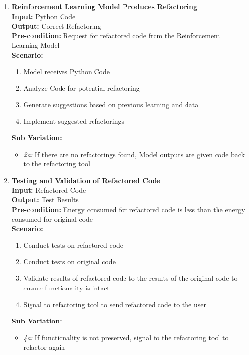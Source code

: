 \documentclass[12pt]{article}
\begin{document}
\begin{enumerate}[label={\bf BUC \arabic*:}, wide=0pt, font=\itshape]
  \item {\bf Reinforcement Learning Model Produces Refactoring} \\[2mm]
    \textbf{Input:} Python Code \\
    \textbf{Output:} Correct Refactoring \\
    \textbf{Pre-condition:} Request for refactored code from the Reinforcement Learning Model \\[2mm]
    \textbf{Scenario: } 
    \begin{enumerate}[label=\arabic*.]
        \item Model receives Python Code
        \item Analyze Code for potential refactoring
        \item Generate suggestions based on previous learning and data
        \item Implement suggested refactorings
    \end{enumerate}
    \textbf{Sub Variation: }
    \begin{itemize}
        \item \textit{2a:} If there are no refactorings found, Model outputs are given code back to the refactoring tool 
    \end{itemize}

  \item {\bf Testing and Validation of Refactored Code} \\[2mm]
    \textbf{Input:} Refactored Code \\
    \textbf{Output:} Test Results \\
    \textbf{Pre-condition:} Energy consumed for refactored code is less than the energy consumed for original code \\[2mm]
    \textbf{Scenario: }
    \begin{enumerate}[label=\arabic*.]
        \item Conduct tests on refactored code
        \item Conduct tests on original code
        \item Validate results of refactored code to the results of the original code to ensure functionality is intact
        \item Signal to refactoring tool to send refactored code to the user
    \end{enumerate}
    \textbf{Sub Variation: }
    \begin{itemize}
        \item \textit{4a:} If functionality is not preserved, signal to the refactoring tool to refactor again
    \end{itemize}


\end{enumerate}
\end{document}
